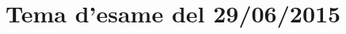 \documentclass[main.tex]{subfiles}
\begin{document}
\section{Tema d'esame del 29/06/2015}


\clearpage

\clearpage

\end{document}
